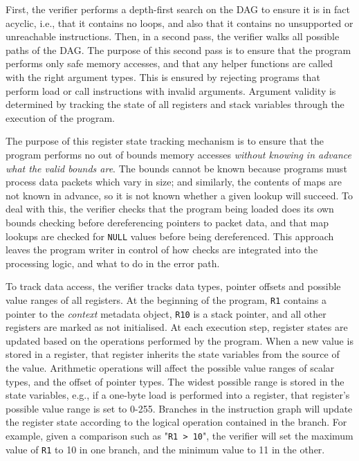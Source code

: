 \documentclass[sigconf]{acmart}
\begin{document}
First, the verifier performs a depth-first search on the DAG to ensure it is in
fact acyclic, i.e., that it contains no loops, and also that it contains no
unsupported or unreachable instructions. Then, in a second pass, the verifier
walks all possible paths of the DAG. The purpose of this second pass is to
ensure that the program performs only safe memory accesses, and that any helper
functions are called with the right argument types. This is ensured by rejecting
programs that perform load or call instructions with invalid arguments. Argument
validity is determined by tracking the state of all registers and stack
variables through the execution of the program.

The purpose of this register state tracking mechanism is to ensure that the
program performs no out of bounds memory accesses \emph{without knowing in
  advance what the valid bounds are}. The bounds cannot be known because
programs must process data packets which vary in size; and similarly, the
contents of maps are not known in advance, so it is not known whether a given
lookup will succeed. To deal with this, the verifier checks that the program
being loaded does its own bounds checking before dereferencing pointers to
packet data, and that map lookups are checked for \texttt{NULL} values before
being dereferenced. This approach leaves the program writer in control of how
checks are integrated into the processing logic, and what to do in the error
path.

To track data access, the verifier tracks data types, pointer offsets and
possible value ranges of all registers. At the beginning of the program,
\texttt{R1} contains a pointer to the \emph{context} metadata object,
\texttt{R10} is a stack pointer, and all other registers are marked as not
initialised. At each execution step, register states are updated based on the
operations performed by the program. When a new value is stored in a register,
that register inherits the state variables from the source of the value.
Arithmetic operations will affect the possible value ranges of scalar types, and
the offset of pointer types. The widest possible range is stored in the state
variables, e.g., if a one-byte load is performed into a register, that
register's possible value range is set to 0-255. Branches in the instruction
graph will update the register state according to the logical operation
contained in the branch. For example, given a comparison such as "\texttt{R1 >
  10}", the verifier will set the maximum value of \texttt{R1} to 10 in one
branch, and the minimum value to 11 in the other.
\end{document}
